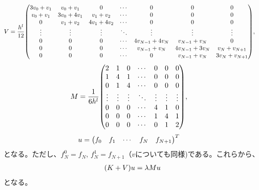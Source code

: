 \documentclass[xelatex,ja=standard]{bxjsarticle}
\begin{document}
\begin{align}
     V&= \frac{h^l}{12}\mqty(
        3v_{0} +v_{1} & v_{0} +v_{1} & 0 & \cdots & 0 & 0 & 0 \\
        v_{0} +v_{1} & 3v_{0} + 4v_{1} & v_{1} +v_{2} & \cdots & 0 & 0 & 0 \\
        0 & v_{1} +v_{2} & 4v_{1} + 4v_{2} & \cdots & 0 & 0 & 0 \\
        \vdots & \vdots & \vdots & \ddots & \vdots  & \vdots& \vdots\\
        0 & 0 & 0 & \cdots & 4v_{N-1} + 4v_{N} & v_{N-1} +v_{N}& 0 \\
        0 & 0 & 0 & \cdots & v_{N-1} +v_{N} & 4v_{N-1} + 3v_{N}& v_{N} +v_{N+1} \\
        0 & 0 & 0 & \cdots & 0 & v_{N-1} +v_{N}& 3v_{N} +v_{N+1} \\
        ),
\end{align}
\begin{align}
    M&=
     \frac{1}{6h^l}\mqty(
     2 & 1 & 0 & \cdots & 0 & 0 & 0 \\
     1 & 4 & 1 & \cdots & 0 & 0 & 0 \\
     0 & 1 & 4 & \cdots & 0 & 0 & 0 \\
     \vdots & \vdots & \vdots & \ddots & \vdots  & \vdots& \vdots\\
     0 & 0 & 0 & \cdots & 4 & 1& 0 \\
     0 & 0 & 0 & \cdots & 1 & 4& 1 \\
     0 & 0 & 0 & \cdots & 0 & 1& 2 \\
     ),
\end{align}
\begin{align}
    u&=\mqty(f_0 & f_1 & \cdots & f_N & f_{N+1})^T
\end{align}
となる。ただし、$f_N^0 = f_N,\, f_N^1 = f_{N+1}$（$v$についても同様)である。これらから、
\begin{align}
    \qty(K + V) u = \lambda Mu 
\end{align}
となる。
\end{document}
